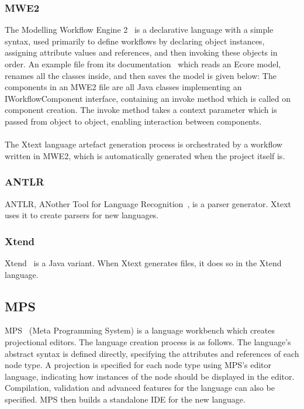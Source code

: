 \documentclass{article}
\begin{document}
\subsubsection{MWE2}
The Modelling Workflow Engine 2~\cite{mwe2} is a declarative language with a simple syntax, used primarily to define workflows by declaring object instances, assigning attribute values and references, and then invoking these objects in order. An example file from its documentation~\cite{mwe2} which reads an Ecore model, renames all the classes inside, and then saves the model is given below: 
The components in an MWE2 file are all Java classes implementing an IWorkflowComponent interface, containing an invoke method which is called on component creation. The invoke method takes a context parameter which is passed from object to object, enabling interaction between components.
\\
\\
The Xtext language artefact generation process is orchestrated by a workflow written in MWE2, which is automatically generated when the project itself is.
\subsubsection{ANTLR}
ANTLR, ANother Tool for Language Recognition~\cite{antlr}, is a parser generator. Xtext uses it to create parsers for new languages.
\subsubsection{Xtend}
Xtend~\cite{xtend} is a Java variant. When Xtext generates files, it does so in the Xtend language.
\subsection{MPS}\label{mps}
MPS~\cite{mps} (Meta Programming System) is a language workbench which creates projectional editors. The language creation process is as follows. The language's abstract syntax is defined directly, specifying the attributes and references of each node type. A projection is specified for each node type using MPS's editor language, indicating how instances of the node should be displayed in the editor. Compilation, validation and advanced features for the language can also be specified. MPS then builds a standalone IDE for the new language. 
\end{document}
